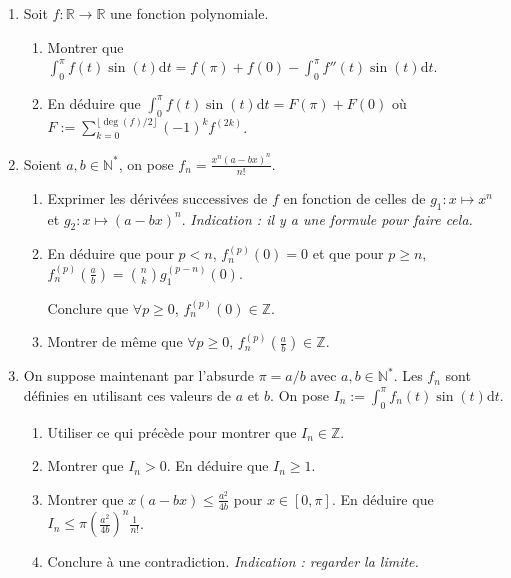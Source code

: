 \documentclass{article}
\newcommand{\di}{\mathrm{d}}
\newcommand{\mb}[1]{\mathbb{#1}}
\begin{document}
\begin{enumerate}

\item Soit $f : \mb{R} \rightarrow \mb{R}$ une fonction polynomiale.

\begin{enumerate}

\item Montrer que $\displaystyle \int_{0}^{\pi} f(t) \sin(t) \di t = f(\pi) + f(0) - \int_0^\pi f''(t) \sin(t) \di t$.

\item En déduire que $\displaystyle \int_{0}^{\pi} f(t) \sin(t) \di t = F(\pi) + F(0)$ où $\displaystyle F := \sum_{k=0}^{\lfloor \deg(f)/2 \rfloor} (-1)^k f^{(2k)}$.

\end{enumerate}


\item Soient $a,b \in \mb{N}^*$, on pose $f_n = \frac{x^n(a-bx)^n}{n!}$.

\begin{enumerate}

\item Exprimer les dérivées successives de $f$ en fonction de celles de $g_1 : x \mapsto x^n$ et $g_2 : x \mapsto (a-bx)^n$. \emph{Indication : il y a une formule pour faire cela.}

\item En déduire que pour $p <n$, $f_n^{(p)}(0) = 0$ et que pour $p \ge n$, $f_n^{(p)} (\frac{a}{b}) = \binom{n}{k} g_1^{(p-n)}(0)$.

Conclure que $\forall p \ge 0$, $f_n^{(p)}(0) \in \mb{Z}$.

\item Montrer de même que $\forall p \ge 0$, $f_n^{(p)}(\frac{a}{b}) \in \mb{Z}$.

\end{enumerate}

\item On suppose maintenant par l'absurde $\pi = a/b$ avec $a,b \in \mb{N}^*$. Les $f_n$ sont définies en utilisant ces valeurs de $a$ et $b$. On pose $\displaystyle I_n := \int_{0}^{\pi} f_n(t) \sin(t) \di t$.


\begin{enumerate}

\item Utiliser ce qui précède pour montrer que $I_n \in \mb{Z}$.

\item Montrer que $I_n > 0$. En déduire que $I_n \ge 1$.

\item Montrer que $x(a-bx) \le \frac{a^2}{4b}$ pour $x \in [0, \pi]$. En déduire que $I_n \le \pi (\frac{a^2}{4b})^n \frac{1}{n!}$.

\item Conclure à une contradiction. \emph{Indication : regarder la limite.}

\end{enumerate}



\end{enumerate}
\end{document}
